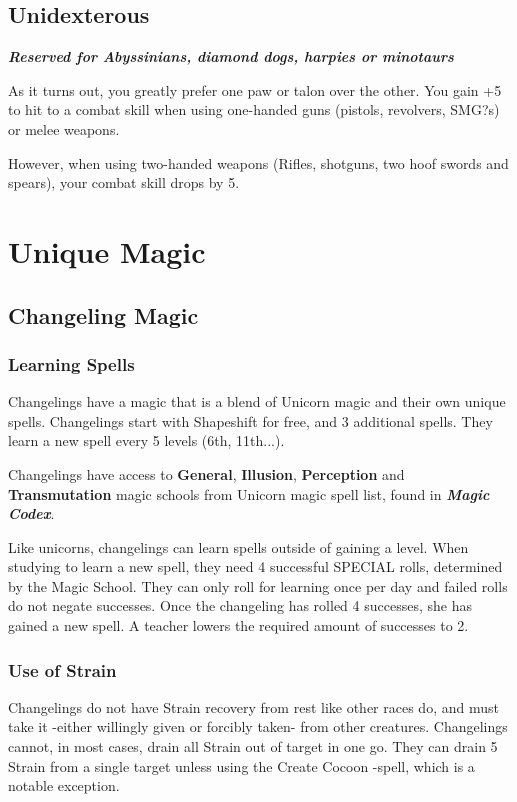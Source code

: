 \documentclass[11pt,a4paper,twocolumn]{book}
\begin{document}
	\section*{Unidexterous}
	\emph{\textbf{Reserved for Abyssinians, diamond dogs, harpies or minotaurs}}
	
	As it turns out, you greatly prefer one paw or talon over the other. You gain +5 to hit to a combat skill when using one-handed guns (pistols, revolvers, SMG?s) or melee weapons. 
	
	However, when using two-handed weapons (Rifles, shotguns, two hoof swords and spears), your combat skill drops by 5.
	
	\clearpage
	
	\chapter{Unique Magic}
	
	\section*{Changeling Magic}
	
	\subsection*{Learning Spells}
	Changelings have a magic that is a blend of Unicorn magic and their own unique spells. Changelings start with Shapeshift for free, and 3 additional spells. They learn a new spell every 5 levels (6th, 11th...).
	
	Changelings have access to \textbf{General}, \textbf{Illusion}, \textbf{Perception} and \textbf{Transmutation} magic schools from Unicorn magic spell list, found in \emph{\textbf{Magic Codex}}.
	
	Like unicorns, changelings can learn spells outside of gaining a level. When studying to learn a new spell, they need 4 successful SPECIAL rolls, determined by the Magic School. They can only roll for learning once per day and failed rolls do not negate successes. Once the changeling has rolled 4 successes, she has gained a new spell. A teacher lowers the required amount of successes to 2.
	
	\subsection*{Use of Strain}
	Changelings do not have Strain recovery from rest like other races do, and must take it -either willingly given or forcibly taken- from other creatures. Changelings cannot, in most cases, drain all Strain out of target in one go. They can drain 5 Strain from a single target unless using the Create Cocoon -spell, which is a notable exception. 
	
\end{document}
